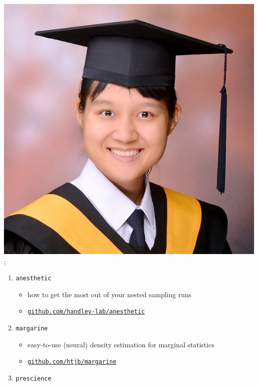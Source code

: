 \documentclass[aspectratio=169]{beamer}
\begin{document}
\begin{frame}
{            \includegraphics[width=0.1\textheight]{figures/students/wei-ning_deng.jpg}%
    };
    \begin{enumerate}
        \item \texttt{anesthetic} 
            \begin{itemize}
                \item how to get the most out of your nested sampling runs 
\item \texttt{\href{https://github.com/handley-lab/anesthetic}{github.com/handley-lab/anesthetic}}
            \end{itemize}
        \item \texttt{margarine} 
            \begin{itemize}
                \item easy-to-use (neural) density estimation for marginal statistics
                \item \texttt{\href{https://github.com/htjb/margarine}{github.com/htjb/margarine}} 
            \end{itemize}
        \item \texttt{prescience} 
            \begin{itemize}

\end{itemize}
\end{enumerate}
\end{frame}
\end{document}
